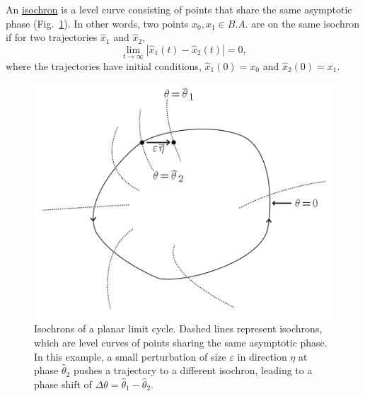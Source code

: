 \documentclass[12pt]{article}
\begin{document}
  
  \begin{definition}
  An \underline{isochron} is a level curve consisting of points that share the same asymptotic phase (Fig.~\ref{fig:sample-phase}).  In other words, two points $x_0,x_1 \in B.A.$ are on the same isochron if for two trajectories $\hat{x}_1$ and $\hat{x}_2$,
  \begin{equation}
   \lim_{t \rightarrow \infty} |\hat{x}_1(t) - \hat{x}_2(t)| = 0,
  \end{equation}
  where the trajectories have initial conditions, $\hat{x}_1(0) = x_0$ and $\hat{x}_2(0) = x_1$.
  \label{def:isochron}
  \end{definition}

\begin{figure}
\begin{center}
 \includegraphics[width=.75\textwidth]{isochron-demo.png}
\end{center}
 \caption[Isochrons of a planar limit cycle]{Isochrons of a planar limit cycle.  Dashed lines represent isochrons, which are level curves of points sharing the same asymptotic phase.  In this example, a small perturbation of size $\varepsilon$ in direction $\eta$ at phase $\hat{\theta}_2$ pushes a trajectory to a different isochron, leading to a phase shift of $\Delta\theta = \hat{\theta}_1 - \hat{\theta}_2$.}
\label{fig:sample-phase}\end{figure}
\end{document}

